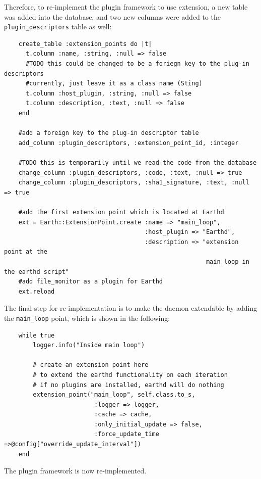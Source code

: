 \documentclass{article}
\begin{document}
Therefore, to re-implement the plugin framework to use extension, a new table was added into the database, and two new columns were added to the \texttt{plugin\_descriptors} table as well:

\begin{verbatim}
    create_table :extension_points do |t|
      t.column :name, :string, :null => false
      #TODO this could be changed to be a foriegn key to the plug-in descriptors
      #currently, just leave it as a class name (Sting)
      t.column :host_plugin, :string, :null => false
      t.column :description, :text, :null => false
    end

    #add a foreign key to the plug-in descriptor table
    add_column :plugin_descriptors, :extension_point_id, :integer
    
    #TODO this is temporarily until we read the code from the database
    change_column :plugin_descriptors, :code, :text, :null => true
    change_column :plugin_descriptors, :sha1_signature, :text, :null => true

    #add the first extension point which is located at Earthd
    ext = Earth::ExtensionPoint.create :name => "main_loop", 
                                       :host_plugin => "Earthd", 
                                       :description => "extension point at the 
                                                        main loop in the earthd script"
    #add file_monitor as a plugin for Earthd
    ext.reload
\end{verbatim}

The final step for re-implementation is to make the daemon extendable by adding the \texttt{main\_loop} point, which is shown in the following:

\begin{verbatim}
    while true
        logger.info("Inside main loop")

        # create an extension point here
        # to extend the earthd functionality on each iteration
        # if no plugins are installed, earthd will do nothing
        extension_point("main_loop", self.class.to_s, 
                         :logger => logger, 
                         :cache => cache, 
                         :only_initial_update => false, 
                         :force_update_time =>@config["override_update_interval"])       
    end
\end{verbatim}

The plugin framework is now re-implemented.

\end{document}

